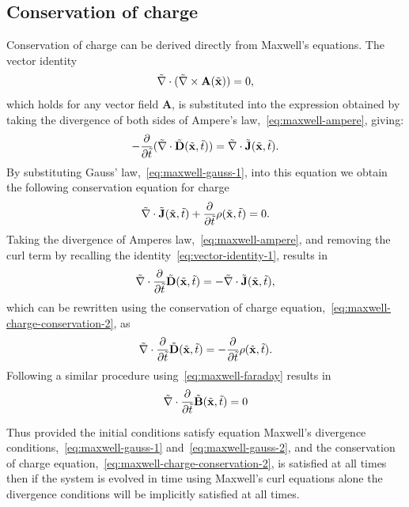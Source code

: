 \subsection{Conservation of charge}
Conservation of charge can be derived directly from Maxwell's equations. The
vector identity
\begin{equation}
  \label{eq:vector-identity-1}
  \tilde{\nabla} \cdot ( \tilde{\nabla} \times \mathbf{A} (\tilde{\mathbf{x}}) ) = 0,
\end{equation}
which holds for any vector field $\mathbf{A}$, is substituted into the
expression obtained by taking the divergence of both sides of Ampere's
law,~\eqref{eq:maxwell-ampere}, giving:
$$
- \frac{\partial}{\partial \tilde{t} } ( \tilde{\nabla} \cdot \tilde{\mathbf{D}}(\tilde{\mathbf{x}},\tilde{t}) ) = \tilde{\nabla}
\cdot \tilde{\mathbf{J}}(\tilde{\mathbf{x}},\tilde{t}) .
$$
By substituting Gauss' law,~\eqref{eq:maxwell-gauss-1}, into this equation we
obtain the following conservation equation for charge
\begin{equation}
  \label{eq:maxwell-charge-conservation-2}
  \tilde{\nabla} \cdot \tilde{\mathbf{J}}(\tilde{\mathbf{x}},\tilde{t}) + \frac{\partial}{\partial \tilde{t} } \rho (\tilde{\mathbf{x}},\tilde{t}) = 0 .
\end{equation}
Taking the divergence of Amperes law,~\eqref{eq:maxwell-ampere}, and removing
the curl term by recalling the identity~\eqref{eq:vector-identity-1}, results in
$$
\tilde{\nabla} \cdot \frac{\partial}{\partial \tilde{t} }  \tilde{\mathbf{D}}(\tilde{\mathbf{x}}, \tilde{t}) = - \tilde{\nabla}
\cdot \tilde{\mathbf{J}}(\tilde{\mathbf{x}},\tilde{t}),
$$
which can be rewritten using the conservation of charge
equation,~\eqref{eq:maxwell-charge-conservation-2}, as
$$
\tilde{\nabla} \cdot \frac{\partial}{\partial \tilde{t} } \tilde{\mathbf{D}}(\tilde{\mathbf{x}}, \tilde{t}) = - \frac{\partial}{\partial \tilde{t} } 
  \rho (\tilde{\mathbf{x}},\tilde{t}).
$$
Following a similar procedure using~\eqref{eq:maxwell-faraday} results in
$$
\tilde{\nabla} \cdot \frac{\partial}{\partial \tilde{t} }  \tilde{\mathbf{B}}(\tilde{\mathbf{x}}, \tilde{t}) = 0
$$

Thus provided the initial conditions satisfy equation Maxwell's divergence
conditions,~\eqref{eq:maxwell-gauss-1} and~\eqref{eq:maxwell-gauss-2}, and the
conservation of charge equation,~\eqref{eq:maxwell-charge-conservation-2}, is
satisfied at all times then if the system is evolved in time using Maxwell's
curl equations alone the divergence conditions will be implicitly satisfied at
all times.


